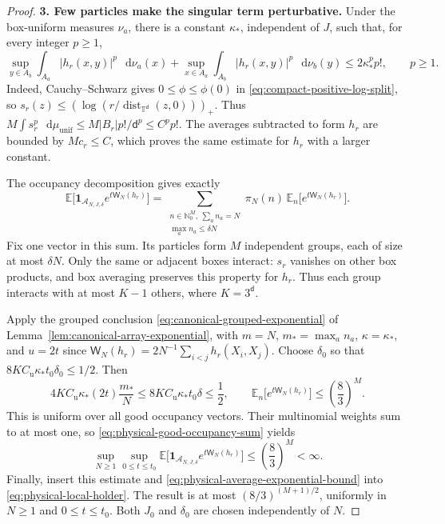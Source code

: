 \documentclass[11pt,reqno]{amsart}
\numberwithin{equation}{section}
\theoremstyle{plain}
\theoremstyle{definition}
\renewcommand{\d}{\mathsf d}
\newcommand{\dd}{\mathop{}\!\mathrm d}
\newcommand{\T}{\mathbb T}
\newcommand{\N}{\mathbb N}
\newcommand{\E}{\mathbb E}
\newcommand{\one}{\mathbf 1}
\newcommand{\muunif}{\mu_{\mathrm{unif}}}
\begin{document}
\begin{proof}
\textbf{3. Few particles make the singular term perturbative.}
Under the box-uniform measures $\nu_a$, there is a constant $\kappa_*$, independent of $J$, such that, for every integer $p\ge1$,
\begin{equation}
 \sup_{y\in A_b}\int_{A_a}|h_r(x,y)|^p\,\dd\nu_a(x)
 +\sup_{x\in A_a}\int_{A_b}|h_r(x,y)|^p\,\dd\nu_b(y)
 \le2\kappa_*^p p!,
 \qquad p\ge1.
 \label{eq:physical-singular-factorial}
\end{equation}
Indeed, Cauchy--Schwarz gives $0\le\phi\le\phi(0)$ in \eqref{eq:compact-positive-log-split}, so $s_r(z)\le(\log(r/\operatorname{dist}_{\T^\d}(z,0)))_+$.  Thus
$M\int s_r^p\,\dd\muunif\le M|B_r|p!/\d^p\le C^p p!$.
The averages subtracted to form $h_r$ are bounded by $Mc_r\le C$, which proves the same estimate for $h_r$ with a larger constant.

The occupancy decomposition gives exactly
\begin{equation}
 \E\big[\one_{\mathcal A_{N,J,\delta}}e^{t\mathsf W_N(h_r)}\big]
 =\sum_{\substack{n\in\N_0^M,\ \sum_a n_a=N\\\max_a n_a\le\delta N}}
   \pi_N(n)\,\E_n\big[e^{t\mathsf W_N(h_r)}\big].
 \label{eq:physical-good-occupancy-sum}
\end{equation}
Fix one vector in this sum.  Its particles form $M$ independent groups, each of size at most $\delta N$.  Only the same or adjacent boxes interact: $s_r$ vanishes on other box products, and box averaging preserves this property for $h_r$.  Thus each group interacts with at most $K-1$ others, where $K=3^\d$.

Apply the grouped conclusion \eqref{eq:canonical-grouped-exponential} of Lemma~\ref{lem:canonical-array-exponential}, with $m=N$, $m_*=\max_a n_a$, $\kappa=\kappa_*$, and $u=2t$ since $\mathsf W_N(h_r)=2N^{-1}\sum_{i<j}h_r(X_i,X_j)$.  Choose $\delta_0$ so that $8K C_{\mathrm u}\kappa_*t_0\delta_0\le1/2$.  Then
\begin{equation}
 4K C_{\mathrm u}\kappa_*(2t)\frac{m_*}{N}
 \le8K C_{\mathrm u}\kappa_*t_0\delta\le\frac12,
 \qquad
 \E_n\big[e^{t\mathsf W_N(h_r)}\big]\le\left(\frac83\right)^M.
 \label{eq:physical-local-effective-coupling}
\end{equation}
This is uniform over all good occupancy vectors.  Their multinomial weights sum to at most one, so \eqref{eq:physical-good-occupancy-sum} yields
\begin{equation}
 \sup_{N\ge1}\sup_{0\le t\le t_0}
 \E\big[\one_{\mathcal A_{N,J,\delta}}e^{t\mathsf W_N(h_r)}\big]
 \le\left(\frac83\right)^M<\infty.
 \label{eq:physical-centered-local-bound}
\end{equation}
Finally, insert this estimate and \eqref{eq:physical-average-exponential-bound} into \eqref{eq:physical-local-holder}.  The result is at most $(8/3)^{(M+1)/2}$, uniformly in $N\ge1$ and $0\le t\le t_0$.  Both $J_0$ and $\delta_0$ are chosen independently of $N$.
\end{proof}
\end{document}
